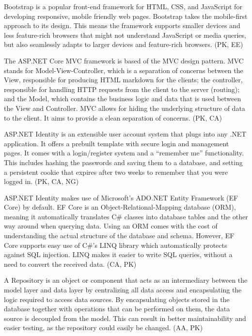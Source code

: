 \documentclass[acmlarge, review=false, screen=true]{acmart}
\begin{document}
Bootstrap is a popular front-end framework for HTML, CSS, and JavaScript for developing responsive, mobile friendly web pages\cite{bootstrap}. Bootstrap takes the mobile-first approach to its design\cite{responsive-web-design}. This means the framework supports smaller devices and less feature-rich browsers that might not understand JavaScript or media queries, but also seamlessly adapts to larger devices and feature-rich browsers. (PK, EE)

The ASP.NET Core MVC framework is based of the MVC design pattern\cite{aspnet-mvc}. MVC stands for Model-View-Controller, which is a separation of concerns between the View, responsible for producing HTML markdown for the clients; the controller, responsible for handling HTTP requests from the client to the server (routing); and the Model, which contains the business logic and data that is used between the View and Controller. MVC allows for hiding the underlying structure of data to the client. It aims to provide a clean separation of concerns. (PK, CA)

ASP.NET Identity is an extensible user account system that plugs into any .NET application\cite{aspnet-identity}. It offers a prebuilt template with secure login and management pages. It comes with a login/register system and a “remember me” functionality. This includes hashing the passwords and saving them to a database, and setting a persistent cookie that expires after two weeks to remember that you were logged in. (PK, CA, NG)

ASP.NET Identity makes use of Microsoft’s ADO.NET Entity Framework (EF Core) by default\cite{adodotnet}. EF Core is an Object-Relational-Mapping database (ORM), meaning it automatically translates C\# classes into database tables and the other way around when querying data. Using an ORM comes with the cost of understanding the actual structure of the database and schema\cite{orm}. However, EF Core supports easy use of C\#’s LINQ library which automatically protects against SQL injection\cite{ef-linq}. LINQ makes it easier to write SQL queries, without a need to convert the received data. (CA, PK)

A Repository is an object or component that acts as an intermediary between the model layer and data layer by centralizing all data access and encapsulating the logic required to access data sources\cite{Repository-pattern}. By encapsulating objects stored in the database together with operations that can be performed on them, the data source is decoupled from the model. This can result in better maintainability and easier testing, as the repository could easily be changed. (AA, PK)
\end{document}
